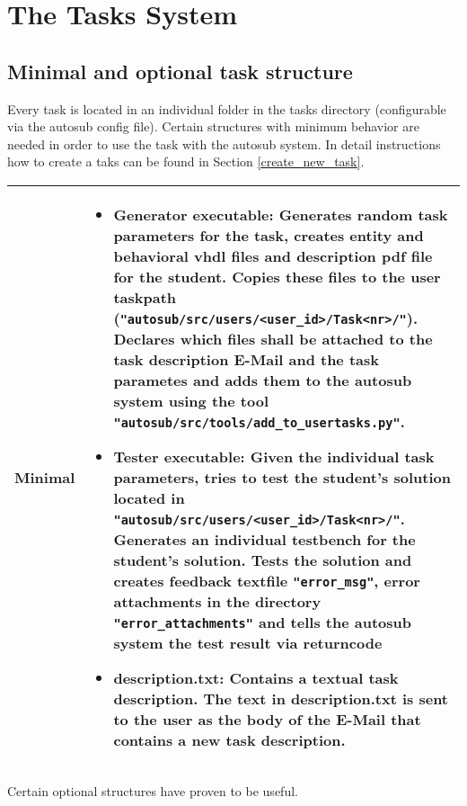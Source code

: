 \section{The Tasks System} \label{tasks_system}

\subsection{Minimal and optional task structure}

Every task is located in an individual folder in the tasks directory (configurable via 
the autosub config file). Certain structures with minimum behavior are needed in order 
to use the task with the autosub system. In detail instructions how to create a taks can 
be found in Section \ref{create_new_task}.

\begin{tabular}{|p{3cm}|p{10cm}|}
\hline

Minimal & \begin{itemize}
    \item {\bf Generator executable:} Generates random task parameters for the task, 
		creates entity and behavioral vhdl files and description pdf file for the student. Copies
		these files to the user taskpath ({\tt "autosub/src/users/<user\_id>/Task<nr>/"}). Declares
		which files shall be attached to the task description E-Mail and the task parametes and 
		adds them to the autosub system using the tool {\tt "autosub/src/tools/add\_to\_usertasks.py"}.
    \item {\bf Tester executable:} Given the individual task parameters, tries to test
		the student's solution located in {\tt "autosub/src/users/<user\_id>/Task<nr>/"}. 
		Generates an individual testbench for the student's solution. Tests 
        the solution and creates feedback textfile {\tt "error\_msg"}, error attachments in the directory
		{\tt "error\_attachments"} and tells the autosub system the test result via returncode
    \item {\bf description.txt:} Contains a textual task description. The text in description.txt 
    	is sent to the user as the body of the E-Mail that contains a new task description.
	\end{itemize} 
\\
\hline
\end{tabular}

\newpage

Certain optional structures have proven to be useful.

